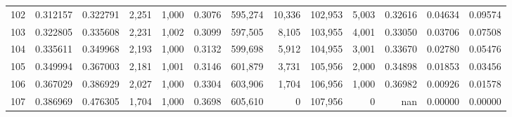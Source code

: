 \begin{tabular}{rrrrrrrrrrrrr}
102 &  0.312157 &  0.322791 &   2,251 &  1,000 &                                     0.3076 &  595,274 &   10,336 &  102,953 &    5,003 &  0.32616 &  0.04634 &  0.09574 \\
103 &  0.322805 &  0.335608 &   2,231 &  1,002 &                                     0.3099 &  597,505 &    8,105 &  103,955 &    4,001 &  0.33050 &  0.03706 &  0.07508 \\
104 &  0.335611 &  0.349968 &   2,193 &  1,000 &                                     0.3132 &  599,698 &    5,912 &  104,955 &    3,001 &  0.33670 &  0.02780 &  0.05476 \\
105 &  0.349994 &  0.367003 &   2,181 &  1,001 &                                     0.3146 &  601,879 &    3,731 &  105,956 &    2,000 &  0.34898 &  0.01853 &  0.03456 \\
106 &  0.367029 &  0.386929 &   2,027 &  1,000 &                                     0.3304 &  603,906 &    1,704 &  106,956 &    1,000 &  0.36982 &  0.00926 &  0.01578 \\
107 &  0.386969 &  0.476305 &   1,704 &  1,000 &                                     0.3698 &  605,610 &        0 &  107,956 &        0 &      nan &  0.00000 &  0.00000 \\
\bottomrule
\end{tabular}

